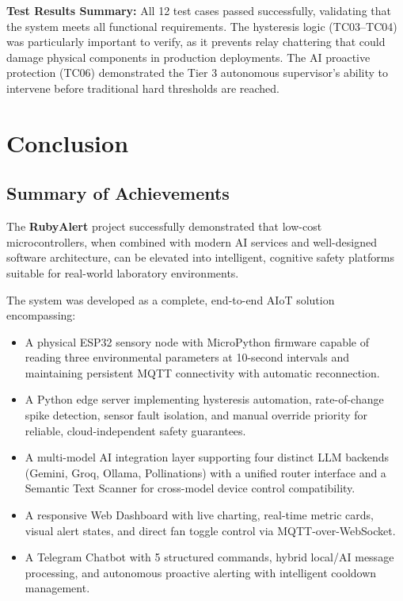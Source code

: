 \documentclass[12pt,a4paper]{report}
\begin{document}
\textbf{Test Results Summary:} All 12 test cases passed successfully, validating that the system meets all functional requirements. The hysteresis logic (TC03--TC04) was particularly important to verify, as it prevents relay chattering that could damage physical components in production deployments. The AI proactive protection (TC06) demonstrated the Tier 3 autonomous supervisor's ability to intervene before traditional hard thresholds are reached.


\chapter{Conclusion}
\label{ch:conclusion}

\section{Summary of Achievements}
The \textbf{RubyAlert} project successfully demonstrated that low-cost microcontrollers, when combined with modern AI services and well-designed software architecture, can be elevated into intelligent, cognitive safety platforms suitable for real-world laboratory environments.

The system was developed as a complete, end-to-end AIoT solution encompassing:
\begin{itemize}
    \item A physical ESP32 sensory node with MicroPython firmware capable of reading three environmental parameters at 10-second intervals and maintaining persistent MQTT connectivity with automatic reconnection.
    \item A Python edge server implementing hysteresis automation, rate-of-change spike detection, sensor fault isolation, and manual override priority for reliable, cloud-independent safety guarantees.
    \item A multi-model AI integration layer supporting four distinct LLM backends (Gemini, Groq, Ollama, Pollinations) with a unified router interface and a Semantic Text Scanner for cross-model device control compatibility.
    \item A responsive Web Dashboard with live charting, real-time metric cards, visual alert states, and direct fan toggle control via MQTT-over-WebSocket.
    \item A Telegram Chatbot with 5 structured commands, hybrid local/AI message processing, and autonomous proactive alerting with intelligent cooldown management.
\end{itemize}
\end{document}
